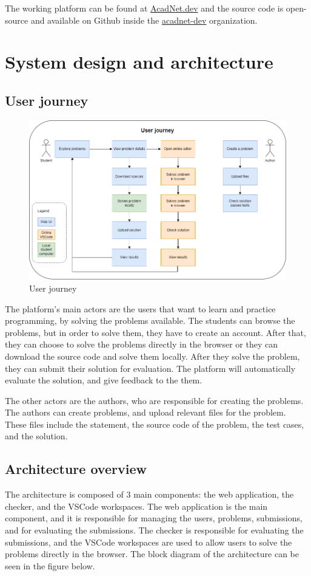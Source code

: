 \documentclass[12pt,a4paper]{report}
\begin{document}
The working platform can be found at \href{https://acadnet.dev}{AcadNet.dev} and the source code is open-source and available on Github inside the \href{https://github.com/acadnet-dev}{acadnet-dev} organization.


\chapter{System design and architecture}
\section{User journey}
\label{user-journey}
\begin{figure}[h]
	\centering
	\includegraphics[width=\linewidth]{../photos/user-journey.png}
	\caption{User journey}
	\label{fig:user-journey}
\end{figure}

The platform's main actors are the users that want to learn and practice programming, by solving the problems available. The students can browse the problems, but in order to solve them, they have to create an account. After that, they can choose to solve the problems directly in the browser or they can download the source code and solve them locally. After they solve the problem, they can submit their solution for evaluation. The platform will automatically evaluate the solution, and give feedback to the them.

The other actors are the authors, who are responsible for creating the problems. The authors can create problems, and upload relevant files for the problem. These files include the statement, the source code of the problem, the test cases, and the solution.

\section{Architecture overview}
The architecture is composed of 3 main components: the web application, the checker, and the VSCode workspaces. The web application is the main component, and it is responsible for managing the users, problems, submissions, and for evaluating the submissions. The checker is responsible for evaluating the submissions, and the VSCode workspaces are used to allow users to solve the problems directly in the browser. The block diagram of the architecture can be seen in the figure below.
\end{document}

